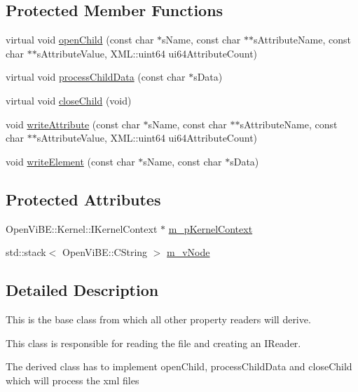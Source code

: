 \subsection*{Protected Member Functions}
\begin{DoxyCompactItemize}
\item 
virtual void \hyperlink{classOpenViBEApplications_1_1ExternalP300PropertyReader_a8a8d1f72afaf3f2f54115578a3d15ac8}{openChild} (const char $\ast$sName, const char $\ast$$\ast$sAttributeName, const char $\ast$$\ast$sAttributeValue, XML::uint64 ui64AttributeCount)
\item 
virtual void \hyperlink{classOpenViBEApplications_1_1ExternalP300PropertyReader_a924d8d7fcedebd489a0b4b20d8c639e0}{processChildData} (const char $\ast$sData)
\item 
virtual void \hyperlink{classOpenViBEApplications_1_1ExternalP300PropertyReader_ad0ec527001193fe02a6017b870043f52}{closeChild} (void)
\item 
void \hyperlink{classOpenViBEApplications_1_1ExternalP300PropertyReader_afacc10c480337882a0e71bef65b0fc2a}{writeAttribute} (const char $\ast$sName, const char $\ast$$\ast$sAttributeName, const char $\ast$$\ast$sAttributeValue, XML::uint64 ui64AttributeCount)
\item 
void \hyperlink{classOpenViBEApplications_1_1ExternalP300PropertyReader_a3fa76c60d9c683d8be053910db63a9e0}{writeElement} (const char $\ast$sName, const char $\ast$sData)
\end{DoxyCompactItemize}
\subsection*{Protected Attributes}
\begin{DoxyCompactItemize}
\item 
OpenViBE::Kernel::IKernelContext $\ast$ \hyperlink{classOpenViBEApplications_1_1ExternalP300PropertyReader_afc976fc78245cb44a0e66f93dcd543cb}{m\_\-pKernelContext}
\item 
std::stack$<$ OpenViBE::CString $>$ \hyperlink{classOpenViBEApplications_1_1ExternalP300PropertyReader_ae1eb64666a2b0da436dffb55d0e79177}{m\_\-vNode}
\end{DoxyCompactItemize}


\subsection{Detailed Description}
This is the base class from which all other property readers will derive. \par
 This class is responsible for reading the file and creating an IReader. \par
 The derived class has to implement openChild, processChildData and closeChild which will process the xml files 

